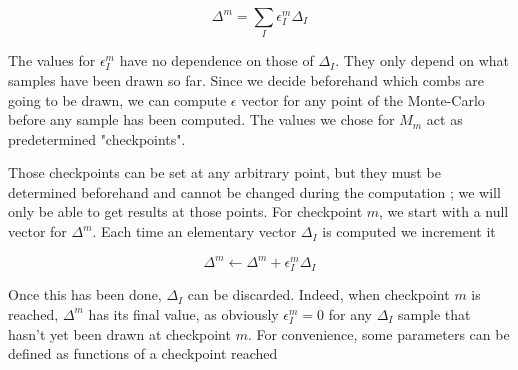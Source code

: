 \documentclass[./thesis.tex]{subfiles}
\begin{document}
\begin{equation}
\Delta^m = \sum_{I} \epsilon^m_{I} \Delta_I
\end{equation}


The values for $\epsilon^m_I$ have no dependence on those of $\Delta_I$. They only depend on what samples have been drawn so far. Since we decide beforehand which combs are going to be drawn, we can compute $\epsilon$ vector for any point of the Monte-Carlo before any sample has been computed. The values we chose for $M_m$ act as predetermined "checkpoints".

Those checkpoints can be set at any arbitrary point, but they must be determined beforehand and cannot be changed during the computation ; we will only be able to get results at those points.
For checkpoint $m$, we start with a null vector for $\Delta^m$. Each time an elementary vector $\Delta_I$ is computed
we increment it 



\begin{equation}
\Delta^m \gets \Delta^m + \epsilon_I^{m} \Delta_I
\end{equation}


Once this has been done, $\Delta_I$ can be discarded. Indeed, when checkpoint $m$ is reached, $\Delta^{m}$ has its final value, as obviously $\epsilon_I^{m} = 0$ for any $\Delta_I$ sample that hasn't yet been drawn at checkpoint ${m}$.
For convenience, some parameters can be defined as functions of a checkpoint reached
\end{document}
